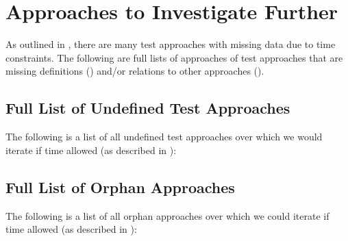 \chapter{Approaches to Investigate Further}\label{app-future}

As outlined in , there are many test approaches with
missing data due to time constraints. The following are full lists of
approaches of test approaches that are missing definitions
() and/or relations to other approaches
().

\section{Full List of Undefined Test Approaches}\label{app-undef-terms}

The following is a list of all \the\numexpr\UndefAfter{} undefined test
approaches over which we would iterate if time allowed (as described in
):

\begin{multicols}{2}
    \raggedright
    \begin{enumerate}
        
    \end{enumerate}
\end{multicols}

\section{Full List of Orphan Approaches}\label{app-orphan-terms}

The following is a list of all \orphanCount{} orphan approaches over which we
could iterate if time allowed (as described in ):

\begin{multicols}{2}
    \raggedright
    \begin{enumerate}
        
    \end{enumerate}
\end{multicols}
